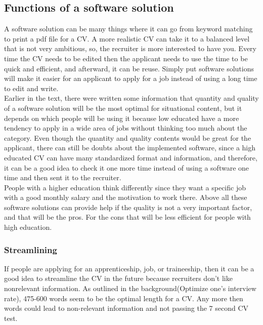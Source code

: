 \subsection{Functions of a software solution}
A software solution can be many things where it can go from keyword matching to print a pdf file for a CV.
A more realistic CV can take it to a balanced level that is not very ambitious, 
so, the recruiter is more interested to have you. Every time the CV needs to be edited
then the applicant needs to use the time to be quick and efficient, and afterward, it can be reuse.
Simply put software solutions will make it easier for an applicant to apply for a job instead of using a long time to edit and write. \\

Earlier in the text, there were written some information 
that quantity and quality of a software solution will be the most optimal for situational content,
but it depends on which people will be using it because low educated have a more tendency to apply
in a wide area of jobs without thinking too much about the category. 
Even though the quantity and quality contents would be great for the applicant, 
there can still be doubts about the implemented software, since a high educated CV can have many standardized format and information,
and therefore, it can be a good idea to check it one more time instead of using a software one time and then sent it to the recruiter. \\

People with a higher education think differently since they want a specific job
with a good monthly salary and the motivation to work there. 
Above all these software solutions can provide help if the quality is not a very important factor,
and that will be the pros. For the cons that will be less efficient for people with high education.

\subsubsection{Streamlining}
If people are applying for an apprenticeship, job, or traineeship, 
then it can be a good idea to streamline the CV in the future because recruiters don't like nonrelevant information.
As outlined in the background(Optimize one's interview rate), 475-600 words seem to be the optimal length for a CV.
Any more then words could lead to non-relevant information and not passing the 7 second CV test. \\

